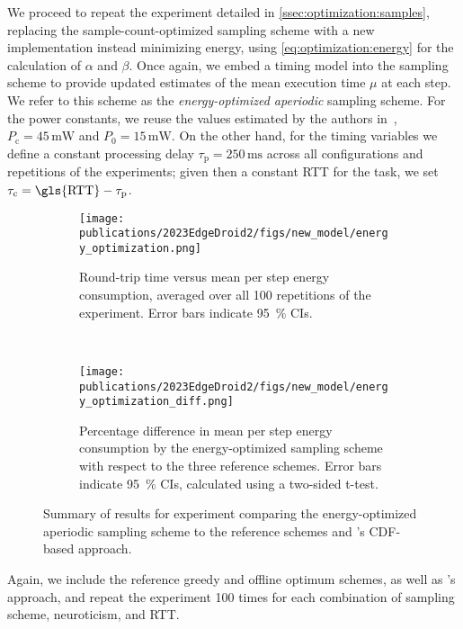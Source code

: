 We proceed to repeat the experiment detailed in \cref{ssec:optimization:samples}, replacing the sample-count-optimized sampling scheme with a new implementation instead minimizing energy, using \cref{eq:optimization:energy} for the calculation of \( \alpha \) and \( \beta \).
Once again, we embed a timing model into the sampling scheme to provide updated estimates of the mean execution time \( \mu \) at each step.
We refer to this scheme as the \emph{energy-optimized aperiodic} sampling scheme.
For the power constants, we reuse the values estimated by the authors in~\cite{moothedath2022energy1}, \( P_\text{c} = 45\,\si{\milli\watt} \) and \( P_\text{0} = 15\,\si{\milli\watt} \).
On the other hand, for the timing variables we define a constant processing delay \( \tau_\text{p} = 250\,\si{\milli\second} \) across all configurations and repetitions of the experiments; given then a constant \gls{RTT} for the task, we set \( \tau_\text{c} = \text{\gls{RTT}} - \tau_\text{p} \).

\begin{figure*}
    \centering
    \begin{subfigure}[t]{\textwidth}
        \centering
        \texttt{[image: publications/2023EdgeDroid2/figs/new\_model/energy\_optimization.png]}
        \caption{%
            Round-trip time versus mean per step energy consumption, averaged over all \num{100} repetitions of the experiment.
            Error bars indicate \SI{95}{\percent} \glspl{CI}.
        }
    \end{subfigure}\\
    \medskip
    \begin{subfigure}[t]{\textwidth}
        \centering
        \texttt{[image: publications/2023EdgeDroid2/figs/new\_model/energy\_optimization\_diff.png]}
        \caption{%
            Percentage difference in mean per step energy consumption by the energy-optimized sampling scheme with respect to the three reference schemes.
            Error bars indicate \SI{95}{\percent} \glspl{CI}, calculated using a two-sided t-test.
        }
    \end{subfigure}
    \caption{%
        Summary of results for experiment comparing the energy-optimized aperiodic sampling scheme to the reference schemes and \textcite{wang2019towards}'s \gls{CDF}-based approach.
    }\label{fig:optimization:energy}
\end{figure*}

Again, we include the reference greedy and offline optimum schemes, as well as \textcite{wang2019towards}'s approach, and repeat the experiment \num{100} times for each combination of sampling scheme, neuroticism, and \gls{RTT}.

